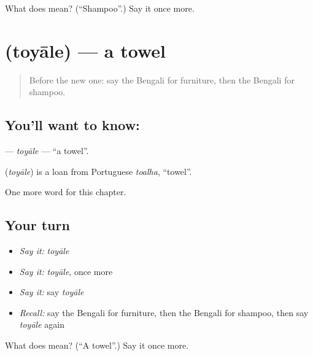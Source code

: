 \begin{tcolorbox}[breakable,colback=teal!4,colframe=teal!35!black,title={Before you move on}]
What does  mean? (\textquotedblleft{}Shampoo\textquotedblright{}.) Say it once more.
\end{tcolorbox}
\section[\texorpdfstring{\bn{তোয়ালে} (toyāle)}{তোয়ালে (toyāle)}]{ (toyāle) — a towel}

\label{lesson:BN-C163-toyale}



\begin{quote}
Before the new one: say the Bengali for furniture, then the Bengali for shampoo.
\end{quote}

\subsection*{You'll want to know: }
\textbf{} — \emph{toyāle} — \textquotedblleft{}a towel\textquotedblright{}.

\begin{cousinweb}
\textbf{} (\emph{toyāle}) is a loan from Portuguese \emph{toalha}, \textquotedblleft{}towel\textquotedblright{}.
\end{cousinweb}

\begin{grammarlens}[title={What you've built}]
One more word for this chapter.
\end{grammarlens}

\subsection*{Your turn}
\begin{itemize}
\raggedright
  \item \emph{Say it:} \emph{toyāle}
  \item \emph{Say it:} \emph{toyāle}, once more
  \item \emph{Say it:} say \emph{toyāle}
  \item \emph{Recall:} say the Bengali for furniture, then the Bengali for shampoo, then say \emph{toyāle} again
\end{itemize}

\begin{tcolorbox}[breakable,colback=teal!4,colframe=teal!35!black,title={Before you move on}]
What does  mean? (\textquotedblleft{}A towel\textquotedblright{}.) Say it once more.
\end{tcolorbox}
